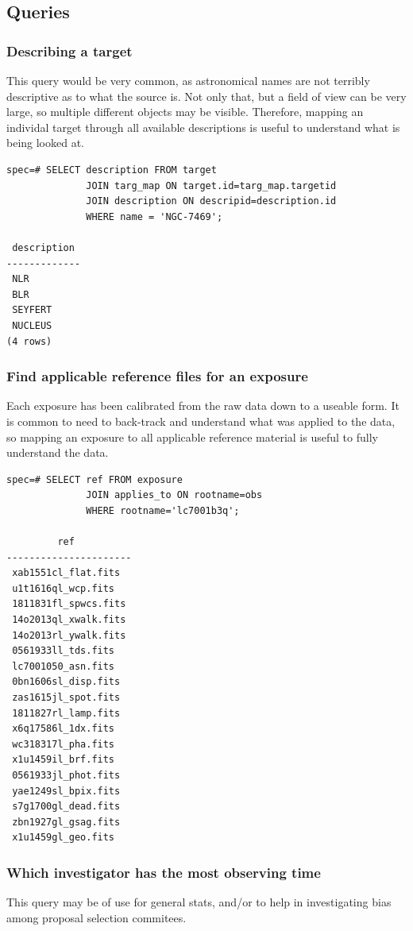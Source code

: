 \documentclass[a4paper,11pt]{article}
\begin{document}
\subsection{Queries}
\subsubsection{Describing a target}
This query would be very common, as astronomical names are not terribly descriptive as to what the source is.  Not only that, but a field of view can be very large, so multiple different objects may be visible.  Therefore, mapping an individal target through all available descriptions is useful to understand what is being looked at. 

\begin{verbatim}
spec=# SELECT description FROM target 
              JOIN targ_map ON target.id=targ_map.targetid 
              JOIN description ON descripid=description.id 
              WHERE name = 'NGC-7469';
			
 description 
-------------
 NLR
 BLR
 SEYFERT
 NUCLEUS
(4 rows)
\end{verbatim}

\subsubsection{Find applicable reference files for an exposure}
Each exposure has been calibrated from the raw data down to a useable form.  It is common to need to back-track and understand what was applied to the data, so mapping an exposure to all applicable reference material is useful to fully understand the data.

\begin{verbatim}
spec=# SELECT ref FROM exposure 
              JOIN applies_to ON rootname=obs 
              WHERE rootname='lc7001b3q';
			
         ref          
----------------------
 xab1551cl_flat.fits
 u1t1616ql_wcp.fits
 1811831fl_spwcs.fits
 14o2013ql_xwalk.fits
 14o2013rl_ywalk.fits
 0561933ll_tds.fits
 lc7001050_asn.fits
 0bn1606sl_disp.fits
 zas1615jl_spot.fits
 1811827rl_lamp.fits
 x6q17586l_1dx.fits
 wc318317l_pha.fits
 x1u1459il_brf.fits
 0561933jl_phot.fits
 yae1249sl_bpix.fits
 s7g1700gl_dead.fits
 zbn1927gl_gsag.fits
 x1u1459gl_geo.fits
\end{verbatim}

\subsubsection{Which investigator has the most observing time}
This query may be of use for general stats, and/or to help in investigating bias among proposal selection commitees.  
\end{document}

